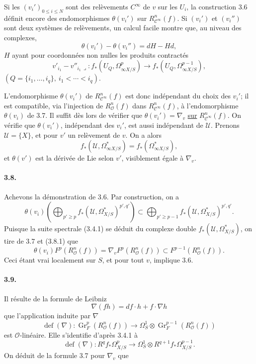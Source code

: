 \documentclass[10pt,leqno]{article}
\newcommand{\cO}{\mathcal O}
\newcommand{\cU}{\mathcal U}
\newcommand{\cC}{\mathcal C}
\newcommand{\Gr}{\operatorname{Gr}}
\theoremstyle{deligne}
\renewcommand{\underline}[1]{\uline{#1}}
\begin{document}
Si les $(v_i')_{0\le i\le N}$ sont des relèvements $C^\infty$ de $v$ sur les $U_i$, la construction 3.6 définit encore des endomorphismes $\theta(v_i')$ sur $R_{\cC^\infty}^n(f)$. Si $(v_i')$ et $(v_i'')$ sont deux systèmes de relèvements, un calcul facile montre que, au niveau des complexes,
\begin{equation}
\theta(v_i')-\theta(v_i'')=dH-Hd,
\tag{3.7.1}
\end{equation}
$H$ ayant pour coordonnées non nulles les produits contractés
\[
v'_{i_1}-v''_{i_1}\lrcorner:
 f_*(U_Q,\Omega^p_{\infty X/S})\longrightarrow f_*(U_Q,\Omega^{p-1}_{\infty X/S}),
\]
$(Q=\{i_1,\ldots,i_q\},\ i_1<\cdots<i_q)$.

L'endomorphisme $\theta(v_i')$ de $R_{\cC^\infty}^n(f)$ est donc indépendant du choix des $v_i'$; il est compatible, via l'injection de $R_\cO^n(f)$ dans $R_{\cC^\infty}^n(f)$, à l'endomorphisme $\theta(v_i)$ de 3.7. Il suffit dès lors de vérifier que $\theta(v_i')=\nabla_v$ \underline{sur} $R_{\cC^\infty}^n(f)$. On vérifie que $\theta(v_i')$, indépendant des $v_i'$, est aussi indépendant de $\cU$. Prenons $\cU=\{X\}$, et pour $v'$ un relèvement de $v$. On a alors
\[
f_*(\cU,\Omega^*_{\infty X/S})=f_*(\Omega^*_{\infty X/S}),
\]
et $\theta(v')$ est la dérivée de Lie selon $v'$, visiblement égale à $\nabla_v$.

\paragraph{3.8.}
Achevons la démonstration de 3.6. Par construction, on a
\begin{equation}
\theta(v_i)\left(\bigoplus_{p'\ge p} f_*(\cU,\Omega^*_{X/S})^{p',q'}\right)
\subset
\bigoplus_{p'\ge p-1} f_*(\cU,\Omega^*_{X/S})^{p',q'} .
\tag{3.8.1}
\end{equation}
Puisque la suite spectrale (3.4.1) se déduit du complexe double $f_*(\cU,\Omega^*_{X/S})$, on tire de 3.7 et (3.8.1) que
\begin{equation}
\theta(v_i)F^p(R_\cO^n(f))=\nabla_vF^p(R_\cO^n(f))\subset F^{p-1}(R_\cO^n(f)).
\tag{3.8.2}
\end{equation}
Ceci étant vrai localement sur $S$, et pour tout $v$, implique 3.6.

\paragraph{3.9.}
Il résulte de la formule de Leibniz
\[
\nabla(fh)=df\cdot h+f\cdot \nabla h
\]
que l'application induite par $\nabla$
\[
\operatorname{def}(\nabla):\Gr_F^p(R_\cO^n(f))\longrightarrow
\Omega_S^1\otimes\Gr_F^{p-1}(R_\cO^n(f))
\]
est $\cO$-linéaire. Elle s'identifie d'après 3.4.1 à
\begin{equation}
\operatorname{def}(\nabla):R^qf_*\Omega^p_{X/S}\longrightarrow
\Omega_S^1\otimes R^{q+1}f_*\Omega^{p-1}_{X/S}.
\tag{3.9.1}
\end{equation}
On déduit de la formule 3.7 pour $\nabla_v$ que
\end{document}
